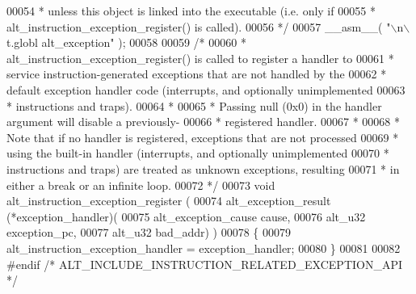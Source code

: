 \begin{DoxyCode}
00054 \textcolor{comment}{ * unless this object is linked into the executable (i.e. only if }
00055 \textcolor{comment}{ * alt\_instruction\_exception\_register() is called).}
00056 \textcolor{comment}{ */}
00057 __asm__( \textcolor{stringliteral}{"\(\backslash\)n\(\backslash\)t.globl alt\_exception"} );
00058 
00059 \textcolor{comment}{/*}
00060 \textcolor{comment}{ * alt\_instruction\_exception\_register() is called to register a handler to}
00061 \textcolor{comment}{ * service instruction-generated exceptions that are not handled by the}
00062 \textcolor{comment}{ * default exception handler code (interrupts, and optionally unimplemented}
00063 \textcolor{comment}{ * instructions and traps). }
00064 \textcolor{comment}{ * }
00065 \textcolor{comment}{ * Passing null (0x0) in the handler argument will disable a previously-}
00066 \textcolor{comment}{ * registered handler.}
00067 \textcolor{comment}{ *}
00068 \textcolor{comment}{ * Note that if no handler is registered, exceptions that are not processed}
00069 \textcolor{comment}{ * using the built-in handler (interrupts, and optionally unimplemented}
00070 \textcolor{comment}{ * instructions and traps) are treated as unknown exceptions, resulting}
00071 \textcolor{comment}{ * in either a break or an infinite loop.}
00072 \textcolor{comment}{ */}
00073 \textcolor{keywordtype}{void} alt\_instruction\_exception\_register (
00074   alt_exception_result (*exception\_handler)(
00075     alt_exception_cause cause,
00076     alt_u32 exception\_pc,
00077     alt_u32 bad\_addr) )
00078 \{
00079   alt_instruction_exception_handler = exception\_handler;
00080 \}
00081 
00082 \textcolor{preprocessor}{#endif }\textcolor{comment}{/* ALT\_INCLUDE\_INSTRUCTION\_RELATED\_EXCEPTION\_API */}\textcolor{preprocessor}{}
\end{DoxyCode}
